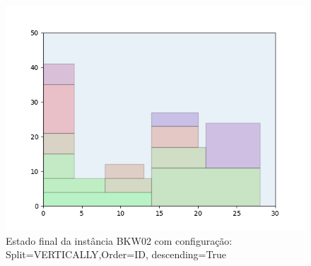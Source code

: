 \begin{figure}[H]
    \centering
    \caption[]{Estado final da instância BKW02 com configuração: Split=VERTICALLY,Order=ID, descending=True}
    \label{fig:bkw02-vertically-id-true}
    \includegraphics[scale=0.5]{output/figures/bkw/bkw02/vertically/id/true/00}
\end{figure}